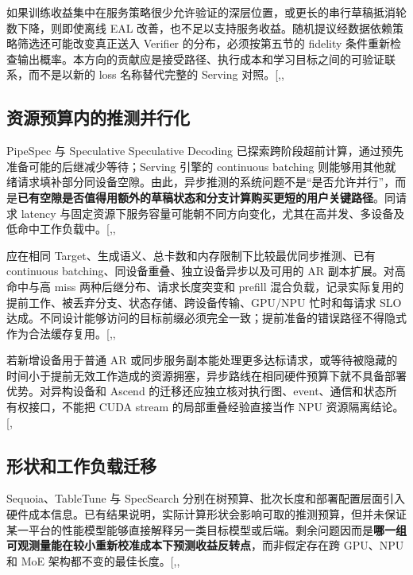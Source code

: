 \documentclass[
  a4paper,
  UTF8,
  fontset=none,
  zihao=5]{ctexart}
\begin{document}
如果训练收益集中在服务策略很少允许验证的深层位置，或更长的串行草稿抵消轮数下降，则即使离线
EAL
改善，也不足以支持服务收益。随机提议经数据依赖策略筛选还可能改变真正送入
Verifier 的分布，必须按第五节的 fidelity
条件重新检查输出概率。本方向的贡献应是接受路径、执行成本和学习目标之间的可验证联系，而不是以新的
loss 名称替代完整的 Serving
对照。{[},,\citeproc{ref-realloss}{35}{]}

\subsection{资源预算内的推测并行化}\label{resource-budget}

PipeSpec 与 Speculative Speculative Decoding
已探索跨阶段超前计算，通过预先准备可能的后继减少等待；Serving 引擎的
continuous batching
则能够用其他就绪请求填补部分同设备空隙。由此，异步推测的系统问题不是``是否允许并行''，而是\textbf{已有空隙是否值得用额外的草稿状态和分支计算购买更短的用户关键路径}。同请求
latency
与固定资源下服务容量可能朝不同方向变化，尤其在高并发、多设备及低命中工作负载中。{[},,\citeproc{ref-ssd}{75}{]}

应在相同 Target、生成语义、总卡数和内存限制下比较最优同步推测、已有
continuous batching、同设备重叠、独立设备异步以及可用的 AR
副本扩展。对高命中与高 miss 两种后继分布、请求长度突变和 prefill
混合负载，记录实际复用的提前工作、被丢弃分支、状态存储、跨设备传输、GPU/NPU
忙时和每请求 SLO
达成。不同设计能够访问的目标前缀必须完全一致；提前准备的错误路径不得隐式作为合法缓存复用。{[},,\citeproc{ref-ssd}{75}{]}

若新增设备用于普通 AR
或同步服务副本能处理更多达标请求，或等待被隐藏的时间小于提前无效工作造成的资源拥塞，异步路线在相同硬件预算下就不具备部署优势。对异构设备和
Ascend 的迁移还应独立核对执行图、event、通信和状态所有权接口，不能把
CUDA stream 的局部重叠经验直接当作 NPU
资源隔离结论。{[},\citeproc{ref-distserve}{73}{]}

\subsection{形状和工作负载迁移}\label{transfer}

Sequoia、TableTune 与 SpecSearch
分别在树预算、批次长度和部署配置层面引入硬件成本信息。已有结果说明，实际计算形状会影响可取的推测预算，但并未保证某一平台的性能模型能够直接解释另一类目标模型或后端。剩余问题因而是\textbf{哪一组可观测量能在较小重新校准成本下预测收益反转点}，而非假定存在跨
GPU、NPU 和 MoE
架构都不变的最佳长度。{[},,\citeproc{ref-specsearch}{61}{]}
\end{document}
